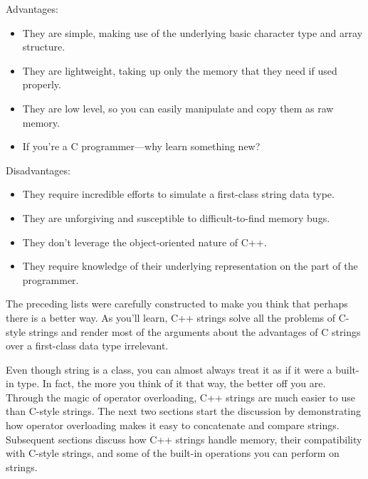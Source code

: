 Advantages:

\begin{itemize}
\item
They are simple, making use of the underlying basic character type and array structure.

\item
They are lightweight, taking up only the memory that they need if used properly.

\item
They are low level, so you can easily manipulate and copy them as raw memory.

\item
If you’re a C programmer—why learn something new?
\end{itemize}

Disadvantages:

\begin{itemize}
\item
They require incredible efforts to simulate a first-class string data type.

\item
They are unforgiving and susceptible to difficult-to-find memory bugs.

\item
They don’t leverage the object-oriented nature of C++.

\item
They require knowledge of their underlying representation on the part of the programmer.
\end{itemize}

The preceding lists were carefully constructed to make you think that perhaps there is a better way. As you’ll learn, C++ strings solve all the problems of C-style strings and render most of the arguments about the advantages of C strings over a first-class data type irrelevant.


Even though string is a class, you can almost always treat it as if it were a built-in type. In fact, the more you think of it that way, the better off you are. Through the magic of operator overloading, C++ strings are much easier to use than C-style strings. The next two sections start the discussion by demonstrating how operator overloading makes it easy to concatenate and compare strings. Subsequent sections discuss how C++ strings handle memory, their compatibility with C-style strings, and some of the built-in operations you can perform on strings.

